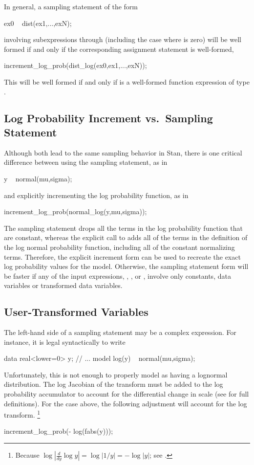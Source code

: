 In general, a sampling statement of the form
%
\begin{stancode}
ex0 ~ dist(ex1,...,exN);
\end{stancode}
%
involving subexpressions  through  (including the
case where  is zero) will be well formed if and only if the
corresponding assignment statement is well-formed,
%
\begin{stancode}
increment_log_prob(dist_log(ex0,ex1,...,exN));
\end{stancode}
%
This will be well formed if and only if
 is a well-formed function expression
of type .

\subsection{Log Probability Increment vs.\ Sampling Statement}

Although both lead to the same sampling behavior in Stan, there is one
critical difference between using the sampling statement, as in
%
\begin{stancode}
y ~ normal(mu,sigma);
\end{stancode}
%
and explicitly incrementing the log probability function, as in
%
\begin{stancode}
increment_log_prob(normal_log(y,mu,sigma));
\end{stancode}
%
The sampling statement drops all the terms in the log probability
function that are constant, whereas the explicit call to
 adds all of the terms in the definition of the log
normal probability function, including all of the constant normalizing
terms.  Therefore, the explicit increment form can be used to recreate
the exact log probability values for the model.  Otherwise, the
sampling statement form will be faster if any of the input expressions,
, , or , involve only constants, data
variables or transformed data variables.


\subsection{User-Transformed Variables}

The left-hand side of a sampling statement may be a complex
expression.  For instance, it is legal syntactically to write
%
\begin{stancode}
data {
  real<lower=0> y;
}
// ...
model {
  log(y) ~ normal(mu,sigma);
}
\end{stancode}
%
Unfortunately, this is not enough to properly model  as having
a lognormal distribution.  The log Jacobian of the transform must be
added to the log probability accumulator to account for the
differential change in scale (see  for
full definitions).  For the case above, the following adjustment will
account for the log transform.%
%
\footnote{Because $\log | \frac{d}{dy} \log y | = \log | 1/y | = - \log
  |y|$;  see .}
%
\begin{stancode}
increment_log_prob(- log(fabs(y)));
\end{stancode}
%

